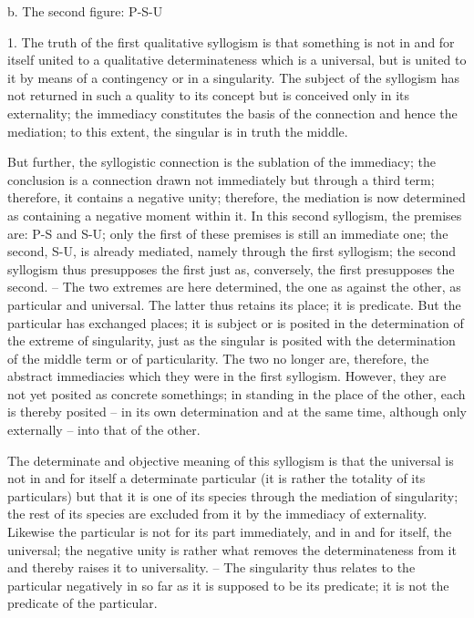 b. The second figure: P-S-U

1. The truth of the first qualitative syllogism is that something is not in
and for itself united to a qualitative determinateness which is a universal,
but is united to it by means of a contingency or in a singularity. The subject
of the syllogism has not returned in such a quality to its concept but is
conceived only in its externality; the immediacy constitutes the basis of the
connection and hence the mediation; to this extent, the singular is in truth
the middle.

But further, the syllogistic connection is the sublation of the immediacy;
the conclusion is a connection drawn not immediately but through a third
term; therefore, it contains a negative unity; therefore, the mediation is
now determined as containing a negative moment within it.
In this second syllogism, the premises are: P-S and S-U; only the first
of these premises is still an immediate one; the second, S-U, is already
mediated, namely through the first syllogism; the second syllogism thus
presupposes the first just as, conversely, the first presupposes the second. –
The two extremes are here determined, the one as against the other, as
particular and universal. The latter thus retains its place; it is predicate.
But the particular has exchanged places; it is subject or is posited in the
determination of the extreme of singularity, just as the singular is posited
with the determination of the middle term or of particularity. The two no
longer are, therefore, the abstract immediacies which they were in the first
syllogism. However, they are not yet posited as concrete somethings; in
standing in the place of the other, each is thereby posited – in its own
determination and at the same time, although only externally – into that
of the other.

The determinate and objective meaning of this syllogism is that the
universal is not in and for itself a determinate particular (it is rather the
totality of its particulars) but that it is one of its species through the mediation
of singularity; the rest of its species are excluded from it by the immediacy
of externality. Likewise the particular is not for its part immediately, and
in and for itself, the universal; the negative unity is rather what removes
the determinateness from it and thereby raises it to universality. – The
singularity thus relates to the particular negatively in so far as it is supposed
to be its predicate; it is not the predicate of the particular.


